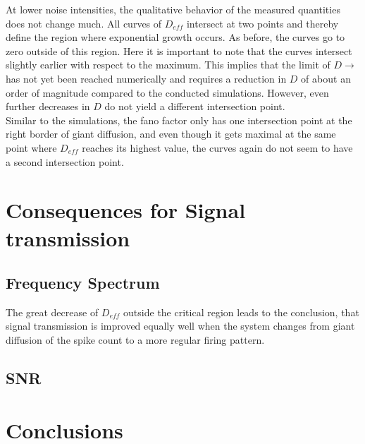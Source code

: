 \documentclass[12pt,a4paper]{article}
\begin{document}
At lower noise intensities, the qualitative behavior of the measured quantities does not change much. All curves of $D_{eff}$ intersect at two points and thereby define the region where exponential growth occurs. As before, the curves go to zero outside of this region. Here it is important to note that the curves intersect slightly earlier with respect to the maximum. This implies that the limit of $D\rightarrow$ has not yet been reached numerically and requires a reduction in $D$ of about an order of magnitude compared to the conducted simulations. However, even further decreases in $D$ do not yield a different intersection point. \\
Similar to the simulations, the fano factor only has one intersection point at the right border of giant diffusion, and even though it gets maximal at the same point where $D_{eff}$ reaches its highest value, the curves again do not seem to have a second intersection point.
\section{Consequences for Signal transmission}
\subsection{Frequency Spectrum}
The great decrease of $D_{eff}$ outside the critical region leads to the conclusion, that signal transmission is improved equally well when the system changes from giant diffusion of the spike count to a more regular firing pattern.
\subsection{SNR}
\section{Conclusions}



\end{document}
